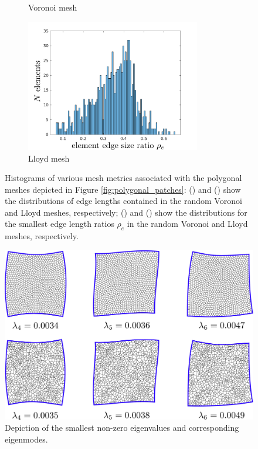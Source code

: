 \begin{figure}[!h]
\begin{subfigure}[b]{0.49\linewidth}
    			\caption{Voronoi mesh \label{fig:patch_edge_ratios}}
    \end{subfigure}
	\begin{subfigure}[b]{0.49\linewidth}
            \centering
            \includegraphics[width=3.0in]{figures/lloyd_edge_ratios.pdf}
    			\caption{Lloyd mesh \label{fig:lloyd_edge_ratios}}
    \end{subfigure}
    \caption{Histograms of various mesh metrics associated with the polygonal meshes depicted in Figure \ref{fig:polygonal_patches}:  () and () show the distributions of edge lengths contained in the random Voronoi and Lloyd meshes, respectively; () and () show the distributions for the smallest edge length ratios $\rho_e$ in the random Voronoi and Lloyd meshes, respectively.}
\end{figure}

\begin{figure}[!h]
  \centering
  \includegraphics[width=5.0in]{figures/patch_eigenmodes_DGPEM.pdf}  \caption{Depiction of the smallest non-zero eigenvalues and corresponding eigenmodes.}
  \label{fig:patch_eigenmodes_DGPEM}
\end{figure}

